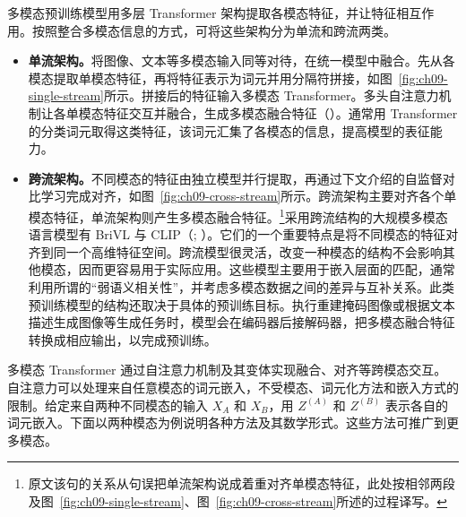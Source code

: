 多模态预训练模型用多层 Transformer 架构提取各模态特征，并让特征相互作用。按照整合多模态信息的方式，可将这些架构分为单流和跨流两类。
\begin{itemize}
\item \textbf{单流架构。}将图像、文本等多模态输入同等对待，在统一模型中融合。先从各模态提取单模态特征，再将特征表示为词元并用分隔符拼接，如图~\ref{fig:ch09-single-stream}所示。拼接后的特征输入多模态 Transformer。多头自注意力机制让各单模态特征交互并融合，生成多模态融合特征（）。通常用 Transformer 的分类词元取得这类特征，该词元汇集了各模态的信息，提高模型的表征能力。
\item \textbf{跨流架构。}不同模态的特征由独立模型并行提取，再通过下文介绍的自监督对比学习完成对齐，如图~\ref{fig:ch09-cross-stream}所示。跨流架构主要对齐各个单模态特征，单流架构则产生多模态融合特征。\footnote{原文该句的关系从句误把单流架构说成着重对齐单模态特征，此处按相邻两段及图~\ref{fig:ch09-single-stream}、图~\ref{fig:ch09-cross-stream}所述的过程译写。}采用跨流结构的大规模多模态语言模型有 BriVL 与 CLIP（; ）。它们的一个重要特点是将不同模态的特征对齐到同一个高维特征空间。跨流模型很灵活，改变一种模态的结构不会影响其他模态，因而更容易用于实际应用。这些模型主要用于嵌入层面的匹配，通常利用所谓的“弱语义相关性”，并考虑多模态数据之间的差异与互补关系。此类预训练模型的结构还取决于具体的预训练目标。执行重建掩码图像或根据文本描述生成图像等生成任务时，模型会在编码器后接解码器，把多模态融合特征转换成相应输出，以完成预训练。
\end{itemize}


多模态 Transformer 通过自注意力机制及其变体实现融合、对齐等跨模态交互。自注意力可以处理来自任意模态的词元嵌入，不受模态、词元化方法和嵌入方式的限制。给定来自两种不同模态的输入 $X_A$ 和 $X_B$，用 $Z^{(A)}$ 和 $Z^{(B)}$ 表示各自的词元嵌入。下面以两种模态为例说明各种方法及其数学形式。这些方法可推广到更多模态。

